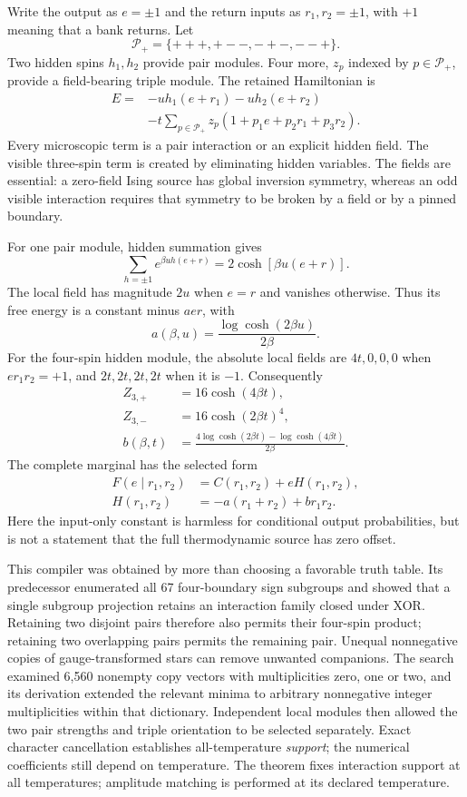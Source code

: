 Write the output as $e=\pm1$ and the return inputs as $r_1,r_2=\pm1$, with $+1$ meaning that a bank returns. Let
\[
 \mathcal P_+=\{+++,+--,-+-,--+\}.
\]
Two hidden spins $h_1,h_2$ provide pair modules. Four more, $z_p$ indexed by $p\in\mathcal P_+$, provide a field-bearing triple module. The retained Hamiltonian is
\[\begin{aligned}
 E={}&-u h_1(e+r_1)-u h_2(e+r_2)\\
 &-t\sum_{p\in\mathcal P_+}z_p
       (1+p_1e+p_2r_1+p_3r_2).
\end{aligned}\]
Every microscopic term is a pair interaction or an explicit hidden field. The visible three-spin term is created by eliminating hidden variables. The fields are essential: a zero-field Ising source has global inversion symmetry, whereas an odd visible interaction requires that symmetry to be broken by a field or by a pinned boundary.

For one pair module, hidden summation gives
\[
 \sum_{h=\pm1}e^{\beta u h(e+r)}
       =2\cosh[\beta u(e+r)].
\]
The local field has magnitude $2u$ when $e=r$ and vanishes otherwise. Thus its free energy is a constant minus $aer$, with
\[
 a(\beta,u)=\frac{\log\cosh(2\beta u)}{2\beta}.
\]
For the four-spin hidden module, the absolute local fields are $4t,0,0,0$ when $er_1r_2=+1$, and $2t,2t,2t,2t$ when it is $-1$. Consequently
\begin{align*}
 Z_{3,+}&=16\cosh(4\beta t),\\
 Z_{3,-}&=16\cosh(2\beta t)^4,\\
 b(\beta,t)&=\frac{4\log\cosh(2\beta t)
                    -\log\cosh(4\beta t)}{2\beta}.
\end{align*}
The complete marginal has the selected form
\begin{align*}
 F(e\mid r_1,r_2)&=C(r_1,r_2)+eH(r_1,r_2),\\
 H(r_1,r_2)&=-a(r_1+r_2)+b r_1r_2.
\end{align*}
Here the input-only constant is harmless for conditional output probabilities, but is not a statement that the full thermodynamic source has zero offset.

This compiler was obtained by more than choosing a favorable truth table. Its predecessor enumerated all 67 four-boundary sign subgroups and showed that a single subgroup projection retains an interaction family closed under XOR. Retaining two disjoint pairs therefore also permits their four-spin product; retaining two overlapping pairs permits the remaining pair. Unequal nonnegative copies of gauge-transformed stars can remove unwanted companions. The search examined 6,560 nonempty copy vectors with multiplicities zero, one or two, and its derivation extended the relevant minima to arbitrary nonnegative integer multiplicities within that dictionary. Independent local modules then allowed the two pair strengths and triple orientation to be selected separately. Exact character cancellation establishes all-temperature \emph{support}; the numerical coefficients still depend on temperature. The theorem fixes interaction support at all temperatures; amplitude matching is performed at its declared temperature.

